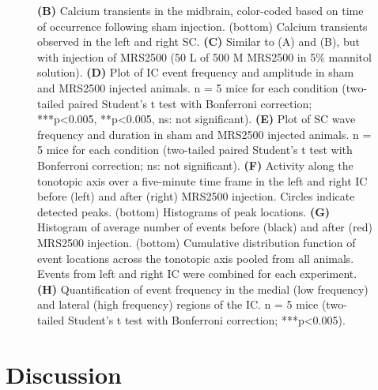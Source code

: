 \documentclass[9pt,lineno]{elife}
\begin{document}
\begin{figure} [t!]
\begin{fullwidth}
\caption{\textbf{(B)} Calcium transients in the midbrain, color-coded based on time of occurrence following sham injection. (bottom) Calcium transients observed in the left and right SC. 
\textbf{(C)} Similar to (A) and (B), but with injection of MRS2500 (50 \textmu L of 500 \textmu M MRS2500 in 5\% mannitol solution). 
\textbf{(D)} Plot of IC event frequency and amplitude in sham and MRS2500 injected animals. n = 5 mice for each condition (two-tailed paired Student’s t test with Bonferroni correction; ***p<0.005, **p<0.005, ns: not significant).
\textbf{(E)} Plot of SC wave frequency and duration in sham and MRS2500 injected animals. n = 5 mice for each condition (two-tailed paired Student’s t test with Bonferroni correction; ns: not significant).
\textbf{(F)} Activity along the tonotopic axis over a five-minute time frame in the left and right IC before (left) and after (right) MRS2500 injection. Circles indicate detected peaks. (bottom) Histograms of peak locations.
\textbf{(G)} Histogram of average number of events before (black) and after (red) MRS2500 injection. (bottom) Cumulative distribution function of event locations across the tonotopic axis pooled from all animals. Events from left and right IC were combined for each experiment.
\textbf{(H)} Quantification of event frequency in the medial (low frequency) and lateral (high frequency) regions of the IC. n = 5 mice (two-tailed Student's t test with Bonferroni correction; ***p<0.005).}
\end{fullwidth}
\end{figure}

\section{Discussion}
\end{document}
